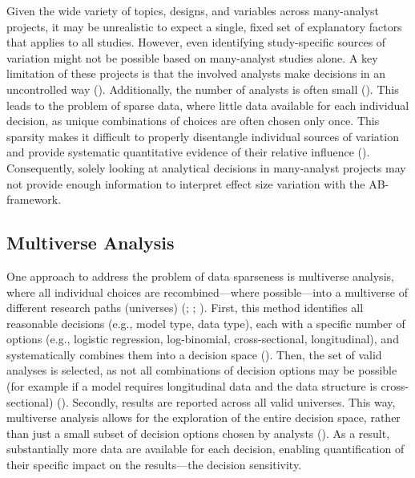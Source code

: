 \documentclass[
  man,
  floatsintext,
  longtable,
  nolmodern,
  notxfonts,
  notimes,
  colorlinks=true,linkcolor=blue,citecolor=blue,urlcolor=blue]{apa7}
\begin{document}
Given the wide variety of topics, designs, and variables across
many-analyst projects, it may be unrealistic to expect a single, fixed
set of explanatory factors that applies to all studies. However, even
identifying study-specific sources of variation might not be possible
based on many-analyst studies alone. A key limitation of these projects
is that the involved analysts make decisions in an uncontrolled way
().
Additionally, the number of analysts is often small
(). This leads to
the problem of sparse data, where little data available for each
individual decision, as unique combinations of choices are often chosen
only once. This sparsity makes it difficult to properly disentangle
individual sources of variation and provide systematic quantitative
evidence of their relative influence
().
Consequently, solely looking at analytical decisions in many-analyst
projects may not provide enough information to interpret effect size
variation with the AB-framework.

\subsection{Multiverse Analysis}\label{multiverse-analysis}

One approach to address the problem of data sparseness is multiverse
analysis, where all individual choices are recombined---where
possible---into a multiverse of different research paths (universes)
(;
; ). First, this method identifies all reasonable decisions
(e.g., model type, data type), each with a specific number of options
(e.g., logistic regression, log-binomial, cross-sectional,
longitudinal), and systematically combines them into a decision space
(). Then, the set
of valid analyses is selected, as not all combinations of decision
options may be possible (for example if a model requires longitudinal
data and the data structure is cross-sectional)
().
Secondly, results are reported across all valid universes. This way,
multiverse analysis allows for the exploration of the entire decision
space, rather than just a small subset of decision options chosen by
analysts (). As a
result, substantially more data are available for each decision,
enabling quantification of their specific impact on the results---the
decision sensitivity.
\end{document}
